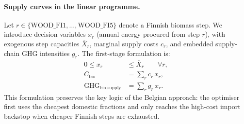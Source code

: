 \documentclass{article}
\begin{document}
\paragraph{Supply curves in the linear programme.}
Let $r \in \{\text{WOOD\_FI1},\dots,\text{WOOD\_FI5}\}$ denote a Finnish biomass step. We introduce decision variables $x_r$ (annual energy procured from step $r$), with exogenous step capacities $\overline{X}_r$, marginal supply costs $c_r$, and embedded supply-chain GHG intensities $g_r$. The first-stage formulation is:
\begin{align}
0 \leq x_r &\leq \overline{X}_r \qquad \forall r,
\label{eq:bio_segment_cap}\\
C_{\text{bio}} &= \sum_r c_r\,x_r,
\label{eq:bio_cost}\\
\text{GHG}_{\text{bio,supply}} &= \sum_r g_r\,x_r.
\label{eq:bio_ghg}
\end{align}
This formulation preserves the key logic of the Belgian approach: the optimiser first uses the cheapest domestic fractions and only reaches the high-cost import backstop when cheaper Finnish steps are exhausted.
\end{document}

